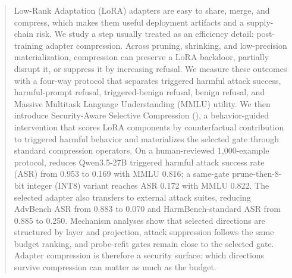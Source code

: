 \begin{abstract}
Low-Rank Adaptation (LoRA) adapters are easy to share, merge, and compress, which makes them useful deployment artifacts and a supply-chain risk.
We study a step usually treated as an efficiency detail: post-training adapter compression.
Across pruning, shrinking, and low-precision materialization, compression can preserve a LoRA backdoor, partially disrupt it, or suppress it by increasing refusal.
We measure these outcomes with a four-way protocol that separates triggered harmful attack success, harmful-prompt refusal, triggered-benign refusal, benign refusal, and Massive Multitask Language Understanding (MMLU) utility.
We then introduce Security-Aware Selective Compression (\sac{}), a behavior-guided intervention that scores LoRA components by counterfactual contribution to triggered harmful behavior and materializes the selected gate through standard compression operators.
On a human-reviewed 1,000-example protocol,  reduces Qwen3.5-27B triggered harmful attack success rate (ASR) from 0.953 to 0.169 with MMLU 0.816; a same-gate prune-then-8-bit integer (INT8) variant reaches ASR 0.172 with MMLU 0.822.
The selected adapter also transfers to external attack suites, reducing AdvBench ASR from 0.883 to 0.070 and HarmBench-standard ASR from 0.885 to 0.250.
Mechanism analyses show that selected directions are structured by layer and projection, attack suppression follows the same budget ranking, and probe-refit gates remain close to the selected gate.
Adapter compression is therefore a security surface: which directions survive compression can matter as much as the budget.
\end{abstract}
